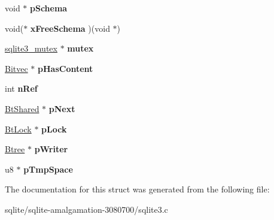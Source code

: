 \begin{DoxyCompactItemize}
\item 
\hypertarget{struct_bt_shared_aea3ccb6775c768fbd4f3e29df8cb925d}{void $\ast$ {\bfseries p\+Schema}}\label{struct_bt_shared_aea3ccb6775c768fbd4f3e29df8cb925d}

\item 
\hypertarget{struct_bt_shared_a7c4816c63acea30ed44ffc58b468463e}{void($\ast$ {\bfseries x\+Free\+Schema} )(void $\ast$)}\label{struct_bt_shared_a7c4816c63acea30ed44ffc58b468463e}

\item 
\hypertarget{struct_bt_shared_a454c31d726220bbed43c165e370460c8}{\hyperlink{structsqlite3__mutex}{sqlite3\+\_\+mutex} $\ast$ {\bfseries mutex}}\label{struct_bt_shared_a454c31d726220bbed43c165e370460c8}

\item 
\hypertarget{struct_bt_shared_ace6191dc3f48f9575d7946ab8cf5b919}{\hyperlink{struct_bitvec}{Bitvec} $\ast$ {\bfseries p\+Has\+Content}}\label{struct_bt_shared_ace6191dc3f48f9575d7946ab8cf5b919}

\item 
\hypertarget{struct_bt_shared_a43d0226fa08d7fae5f992f3a2d72cc08}{int {\bfseries n\+Ref}}\label{struct_bt_shared_a43d0226fa08d7fae5f992f3a2d72cc08}

\item 
\hypertarget{struct_bt_shared_aaa9dd5c5d4ec2bb79ebe4b37ee926ae3}{\hyperlink{struct_bt_shared}{Bt\+Shared} $\ast$ {\bfseries p\+Next}}\label{struct_bt_shared_aaa9dd5c5d4ec2bb79ebe4b37ee926ae3}

\item 
\hypertarget{struct_bt_shared_af58c79eec88f99ed5a07d8cabf8a1d1a}{\hyperlink{struct_bt_lock}{Bt\+Lock} $\ast$ {\bfseries p\+Lock}}\label{struct_bt_shared_af58c79eec88f99ed5a07d8cabf8a1d1a}

\item 
\hypertarget{struct_bt_shared_ad8b2679e54027d58a3be3afcca4df1d6}{\hyperlink{struct_btree}{Btree} $\ast$ {\bfseries p\+Writer}}\label{struct_bt_shared_ad8b2679e54027d58a3be3afcca4df1d6}

\item 
\hypertarget{struct_bt_shared_a89102c20327da8a304f7e95af557bdf4}{u8 $\ast$ {\bfseries p\+Tmp\+Space}}\label{struct_bt_shared_a89102c20327da8a304f7e95af557bdf4}

\end{DoxyCompactItemize}


The documentation for this struct was generated from the following file\+:\begin{DoxyCompactItemize}
\item 
sqlite/sqlite-\/amalgamation-\/3080700/sqlite3.\+c\end{DoxyCompactItemize}
